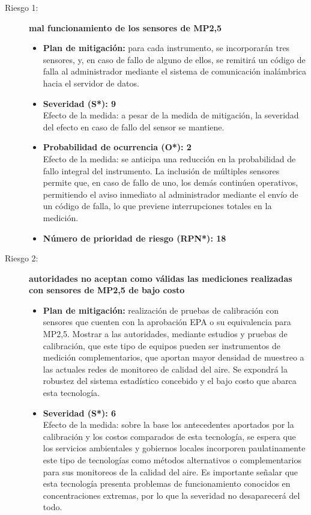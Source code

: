 \begin{description}
	\item[Riesgo 1:]\textbf{mal funcionamiento de los sensores de MP2,5}
	\begin{itemize}
		\item \textbf{Plan de mitigación:} para cada instrumento, se incorporarán tres sensores, y, en caso de fallo de alguno de ellos, se remitirá un código de falla al administrador mediante el sistema de comunicación inalámbrica hacia el servidor de datos.
		\item \textbf{Severidad (S*): 9} \\
		Efecto de la medida: a pesar de la medida de mitigación, la severidad del efecto en caso de fallo del sensor se mantiene.
		\item \textbf{Probabilidad de ocurrencia (O*): 2} \\
		Efecto de la medida: se anticipa una reducción en la probabilidad de fallo integral del instrumento. La inclusión de múltiples sensores permite que, en caso de fallo de uno, los demás continúen operativos, permitiendo el aviso inmediato al administrador mediante el envío de un código de falla, lo que previene interrupciones totales en la medición.
		\item \textbf{Número de prioridad de riesgo (RPN*): 18}
	\end{itemize}
	
	\item[Riesgo 2:] \textbf{autoridades no aceptan como válidas las mediciones realizadas con sensores de MP2,5 de bajo costo}  	 
	\begin{itemize}
		
		\item \textbf{Plan de mitigación:} realización de pruebas de calibración con sensores que cuenten con la aprobación EPA o su equivalencia para MP2,5. Mostrar a las autoridades, mediante estudios y pruebas de calibración, que este tipo de equipos pueden ser instrumentos de medición complementarios, que aportan mayor densidad  de muestreo a las actuales redes de monitoreo de calidad del aire. Se expondrá la robustez del sistema estadístico concebido y el bajo costo que abarca esta tecnología.   
		\item \textbf{Severidad (S*): 6} \\
		Efecto de la medida: sobre la base los antecedentes aportados por la calibración y los costos comparados de esta tecnología, se espera que los servicios ambientales y gobiernos locales incorporen paulatinamente este tipo de tecnologías como métodos alternativos o complementarios para sus monitoreos de la calidad del aire. Es importante señalar que esta tecnología presenta problemas de funcionamiento conocidos en concentraciones extremas, por lo que la severidad no desaparecerá del todo.
		

\end{itemize}
\end{description}
